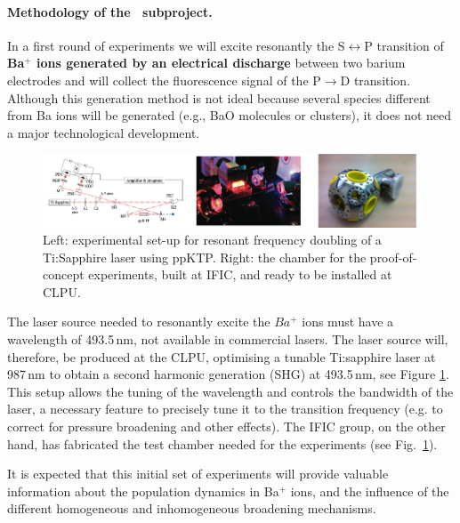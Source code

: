 \paragraph{Methodology of the \BATA\ subproject.}

In a first round of experiments we will excite resonantly the S$\leftrightarrow$P transition of {\bf Ba$^+$ ions generated by an electrical discharge} between two barium electrodes and will collect the fluorescence signal of the P$\rightarrow$D transition. Although this generation method is not ideal because several species different from Ba ions will be generated (e.g., BaO molecules or clusters), it does not need a major technological development. 

\begin{figure}
\begin{center}
\includegraphics[width=0.99\textwidth]{img/blueLaser.png}
\caption{\small Left: experimental set-up for resonant frequency doubling of a 
Ti:Sapphire laser using ppKTP. Right: the chamber for the proof-of-concept experiments, built at IFIC, and ready to be installed at CLPU.}
\label{fig:chamber}
\end{center}
\end{figure}

The laser source needed to resonantly excite the $Ba^{+}$ ions must have a wavelength of 493.5\,nm, not available in commercial lasers. The laser source will, therefore, be produced at the CLPU, optimising a tunable Ti:sapphire laser at 987\,nm to obtain a second harmonic generation (SHG) at 493.5\,nm, see Figure \ref{fig:chamber}. This setup allows the tuning of the wavelength and controls the bandwidth of the laser, a necessary feature to precisely tune it to the transition frequency (e.g. to correct for pressure broadening and other effects). The IFIC group, on the other hand, has fabricated the test chamber needed for the experiments (see Fig.~\ref{fig:chamber}). 

It is expected that this initial set of experiments will provide valuable information about the population dynamics in Ba$^+$ ions, and the influence of the different homogeneous and inhomogeneous broadening mechanisms. 

